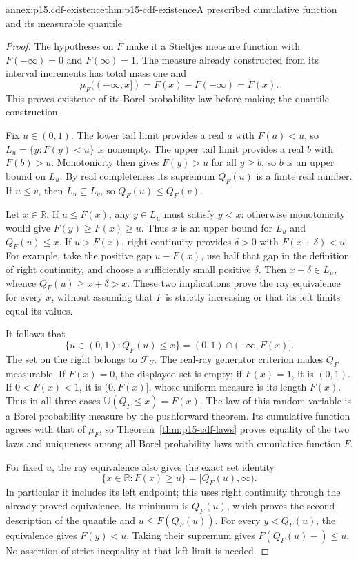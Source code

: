 \begin{annexitem}{annex:p15.cdf-existence}{thm:p15-cdf-existence}{A prescribed cumulative function and its measurable quantile}
\begin{proof}
The hypotheses on \(F\) make it a Stieltjes measure function with
\(F(-\infty)=0\) and \(F(\infty)=1\). The measure already
constructed from its interval increments has total mass one and
\[
 \mu_F((-\infty,x])=F(x)-F(-\infty)=F(x).
\]
This proves existence of its Borel probability law before making the
quantile construction.

Fix \(u\in(0,1)\). The lower tail limit provides a real \(a\)
with \(F(a)<u\), so \(L_u=\{y:F(y)<u\}\) is nonempty. The
upper tail limit provides a real \(b\) with \(F(b)>u\).
Monotonicity then gives \(F(y)>u\) for all \(y\geq b\), so
\(b\) is an upper bound on \(L_u\). By real completeness its
supremum \(Q_F(u)\) is a finite real number. If \(u\leq v\),
then \(L_u\subseteq L_v\), so \(Q_F(u)\leq Q_F(v)\).

Let \(x\in\mathbb R\). If \(u\leq F(x)\), any
\(y\in L_u\) must satisfy \(y<x\): otherwise monotonicity
would give \(F(y)\geq F(x)\geq u\). Thus \(x\) is an upper
bound for \(L_u\) and \(Q_F(u)\leq x\).
If \(u>F(x)\), right continuity provides \(\delta>0\) with
\(F(x+\delta)<u\). For example, take the positive gap
\(u-F(x)\), use half that gap in the definition of right continuity,
and choose a sufficiently small positive \(\delta\).
Then \(x+\delta\in L_u\), whence
\(Q_F(u)\geq x+\delta>x\). These two implications prove the
ray equivalence for every \(x\), without assuming that \(F\) is
strictly increasing or that its left limits equal its values.

It follows that
\[
 \{u\in(0,1):Q_F(u)\leq x\}
                  =(0,1)\cap(-\infty,F(x)].
\]
The set on the right belongs to \(\mathcal F_U\). The real-ray
generator criterion makes \(Q_F\) measurable. If \(F(x)=0\),
the displayed set is empty; if \(F(x)=1\), it is \((0,1)\).
If \(0<F(x)<1\), it is \((0,F(x)]\), whose uniform measure
is its length \(F(x)\). Thus in all three cases
\(\mathbb U(Q_F\leq x)=F(x)\). The law of this random variable
is a Borel probability measure by the pushforward theorem. Its cumulative
function agrees with that of \(\mu_F\), so
Theorem~\ref{thm:p15-cdf-laws} proves equality of the two laws and
uniqueness among all Borel probability laws with cumulative function \(F\).

For fixed \(u\), the ray equivalence also gives the exact set identity
\[
 \{x\in\mathbb R:F(x)\geq u\}=[Q_F(u),\infty).
\]
In particular it includes its left endpoint; this uses right continuity
through the already proved equivalence. Its minimum is \(Q_F(u)\),
which proves the second description of the quantile and
\(u\leq F(Q_F(u))\). For every \(y<Q_F(u)\), the equivalence
gives \(F(y)<u\). Taking their supremum gives
\(F(Q_F(u)-)\leq u\). No assertion of strict inequality at that
left limit is needed.


\end{proof}
\end{annexitem}
